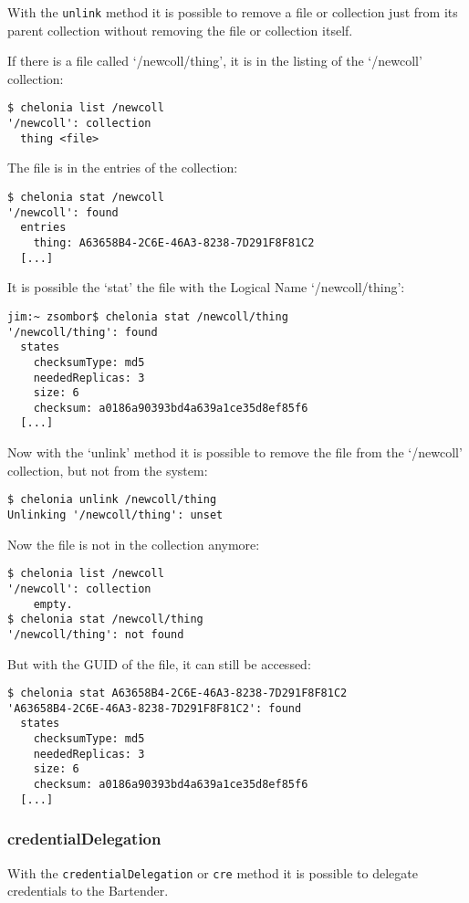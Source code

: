 With the \texttt{unlink} method it is possible to remove a file or collection just from its parent collection without removing the file or collection itself.
\hspace*{0.5cm}
\begin{shaded}
\end{shaded}

If there is a file called `/newcoll/thing', it is in the listing of the `/newcoll' collection:
\begin{verbatim}
$ chelonia list /newcoll
'/newcoll': collection
  thing <file>
\end{verbatim}    
The file is in the entries of the collection:
\begin{verbatim}
$ chelonia stat /newcoll
'/newcoll': found
  entries
    thing: A63658B4-2C6E-46A3-8238-7D291F8F81C2
  [...]
\end{verbatim}

It is possible the `stat' the file with the Logical Name `/newcoll/thing':
\begin{verbatim}
jim:~ zsombor$ chelonia stat /newcoll/thing
'/newcoll/thing': found
  states
    checksumType: md5
    neededReplicas: 3
    size: 6
    checksum: a0186a90393bd4a639a1ce35d8ef85f6
  [...]
\end{verbatim}

Now with the `unlink' method it is possible to remove the file from the `/newcoll' collection, but not from the system:
\begin{verbatim}
$ chelonia unlink /newcoll/thing
Unlinking '/newcoll/thing': unset
\end{verbatim}

Now the file is not in the collection anymore:
\begin{verbatim}
$ chelonia list /newcoll
'/newcoll': collection
    empty.
$ chelonia stat /newcoll/thing
'/newcoll/thing': not found
\end{verbatim}

But with the GUID of the file, it can still be accessed:
\begin{verbatim}
$ chelonia stat A63658B4-2C6E-46A3-8238-7D291F8F81C2
'A63658B4-2C6E-46A3-8238-7D291F8F81C2': found
  states
    checksumType: md5
    neededReplicas: 3
    size: 6
    checksum: a0186a90393bd4a639a1ce35d8ef85f6
  [...]
\end{verbatim}

\subsubsection{credentialDelegation} %
\label{ssub:credentialdelegation}
With the \texttt{credentialDelegation} or \texttt{cre} method it is possible to delegate credentials to the Bartender.
\hspace*{0.5cm}
\begin{shaded}
\end{shaded}

